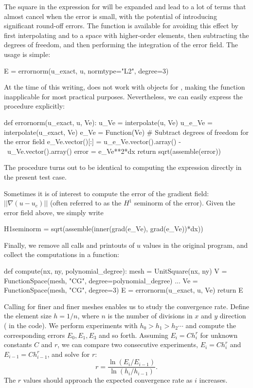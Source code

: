 The square in the expression for 
will be expanded and lead to a lot of terms that almost cancel when
the error is small, with the potential of introducing significant
round-off errors.  The function
 is available for avoiding
this effect by first interpolating 
and  to a space with higher-order
elements, then subtracting the degrees of freedom, and then performing
the integration of the error field. The usage is simple:
\begin{python}
E = errornorm(u_exact, u, normtype="L2", degree=3)
\end{python}
At the time of this writing, 
does not work with  objects
for , making the function
inapplicable for most practical purposes. Nevertheless, we can easily
express the procedure explicitly:
\begin{python}
def errornorm(u_exact, u, Ve):
    u_Ve = interpolate(u, Ve)
    u_e_Ve = interpolate(u_exact, Ve)
    e_Ve = Function(Ve)
    # Subtract degrees of freedom for the error field
    e_Ve.vector()[:] = u_e_Ve.vector().array() - \
                       u_Ve.vector().array()
    error = e_Ve**2*dx
    return sqrt(assemble(error))
\end{python}
The  procedure turns out to be identical to computing
the expression \emp{(u\_e - u)**2*dx} directly in
the present test case.

Sometimes it is of interest to compute the error of the gradient
field: $||\nabla (u-u_e)||$ (often referred to as the $H^1$ seminorm
of the error).  Given the error field
 above, we simply write
\begin{python}
H1seminorm = sqrt(assemble(inner(grad(e_Ve), grad(e_Ve))*dx))
\end{python}

Finally, we remove all  calls and
printouts of $u$ values in the original program, and collect the
computations in a function:
\begin{python}
def compute(nx, ny, polynomial_degree):
    mesh = UnitSquare(nx, ny)
    V = FunctionSpace(mesh, "CG", degree=polynomial_degree)
    ...
    Ve = FunctionSpace(mesh, "CG", degree=3)
    E = errornorm(u_exact, u, Ve)
    return E
\end{python}

Calling  for finer and finer
meshes enables us to study the convergence rate. Define the element
size $h=1/n$, where $n$ is the number of divisions in $x$ and $y$
direction (\emp{nx=ny} in the code). We
perform experiments with $h_0>h_1>h_2\cdots$ and compute the
corresponding errors $E_0, E_1, E_3$ and so forth.  Assuming
$E_i=Ch_i^r$ for unknown constants $C$ and $r$, we can compare two
consecutive experiments, $E_i=Ch_i^r$ and $E_{i-1}=Ch_{i-1}^r$, and
solve for $r$:
\begin{equation*}
  r = \frac{\ln(E_i/E_{i-1})}{\ln (h_i/h_{i-1})}.
\end{equation*}
The $r$ values should approach the expected convergence
rate  as $i$ increases.

